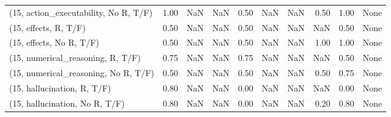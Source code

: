 \begin{table*}[h!]
\begin{adjustbox}{width=2\columnwidth,center}
\begin{tabular}{lrrr|rrr|rrr}
(15, action\_executability, No R, T/F) &                      1.00 &                   NaN &                       NaN &                          0.50 &                       NaN &                           NaN &                                   0.50 &                               1.00 &                                  None \\
(15, effects, R, T/F)                 &                      0.50 &                   NaN &                       NaN &                          0.50 &                       NaN &                           NaN &                                    NaN &                               0.50 &                                  None \\
(15, effects, No R, T/F)              &                      0.50 &                   NaN &                       NaN &                          0.50 &                       NaN &                           NaN &                                   1.00 &                               1.00 &                                  None \\
(15, numerical\_reasoning, R, T/F)     &                      0.75 &                   NaN &                       NaN &                          0.75 &                       NaN &                           NaN &                                    NaN &                               0.50 &                                  None \\
(15, numerical\_reasoning, No R, T/F)  &                      0.50 &                   NaN &                       NaN &                          0.50 &                       NaN &                           NaN &                                   0.50 &                               0.75 &                                  None \\
(15, hallucination, R, T/F)           &                      0.80 &                   NaN &                       NaN &                          0.00 &                       NaN &                           NaN &                                    NaN &                               0.00 &                                  None \\
(15, hallucination, No R, T/F)        &                      0.80 &                   NaN &                       NaN &                          0.00 &                       NaN &                           NaN &                                   0.20 &                               0.80 &                                  None \\

\end{tabular}
\end{adjustbox}
\end{table*}
